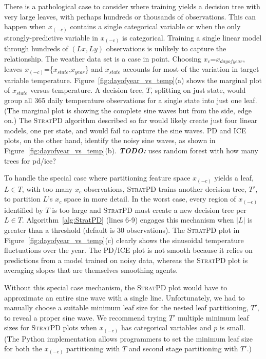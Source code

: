 \documentclass[12pt]{article}
\newcommand{\figref}[1]{Figure~\ref{#1}}
\newcommand{\algref}[1]{Algorithm~\ref{#1}}
\newcommand{\todo}[1]{{\bf\em TODO:} {{#1}}}
\newcommand{\spd}{\fontfamily{cmr}\textsc{\small StratPD}}
\newcommand{\xnc}{$x_{(-c)}$}
\begin{document}
There is a pathological case to consider where training yields a decision tree with very large leaves, with perhaps hundreds or thousands of observations.  This can happen when \xnc{} contains a single categorical variable or when the only strongly-predictive variable in \xnc{} is categorical.  Training a single linear model through hundreds of $(Lx, Ly)$ observations is unlikely to capture the relationship.  The weather data set is a case in point. Choosing $x_c$=$x_{dayofyear}$, leaves \xnc{}=\{$x_{state}$,$x_{year}$\} and $x_{state}$ accounts for most of the variation in target variable temperature.  \figref{fig:dayofyear_vs_temp}(a) shows the marginal plot of $x_{state}$ versus temperature. A decision tree, $T$, splitting on just state, would group all 365 daily temperature observations for a single state into just one leaf. (The marginal plot is showing the complete sine waves but from the side, edge on.)  The \spd{} algorithm described so far would likely create just four linear models, one per state, and would fail to capture the sine waves. PD and ICE plots, on the other hand, identify the noisy sine waves, as shown in \figref{fig:dayofyear_vs_temp}(b). \todo{uses random forest with how many trees for pd/ice?}

To handle the special case where partitioning feature space \xnc{} yields a leaf, $L \in T$, with too many $x_c$ observations, \spd{} trains another decision tree, $T'$, to partition $L$'s $x_c$ space in more detail. In the worst case, every region of \xnc{} identified by $T$ is too large and \spd{} must create a new decision tree per $L \in T$. \algref{alg:StratPD} (lines 6-9) engages this mechanism when $|L|$ is greater than a threshold (default is 30 observations). The \spd{} plot in \figref{fig:dayofyear_vs_temp}(c) clearly shows the sinusoidal temperature fluctuations over the year. The PD/ICE plot is not smooth because it relies on predictions from a model trained on noisy data, whereas the \spd{} plot is averaging slopes that are themselves smoothing agents.

Without this special case mechanism, the \spd{} plot would have to approximate an entire sine wave with a single line.  Unfortunately, we had to manually choose a suitable minimum leaf size for the nested leaf partitioning, $T'$, to reveal a proper sine wave.  We recommend trying $T'$ multiple minimum leaf sizes for \spd{} plots when \xnc{} has categorical variables and $p$ is small. (The Python implementation allows programmers to set the minimum leaf size for both the \xnc{} partitioning with $T$ and second stage partitioning with $T'$.)
\end{document}
